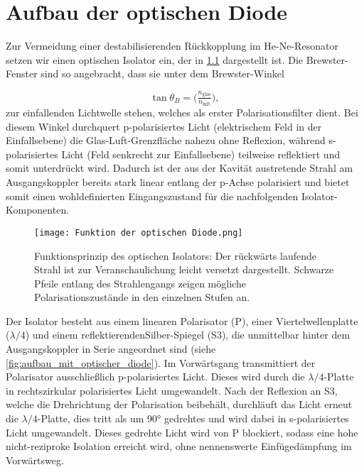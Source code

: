 \chapter{ Aufbau der optischen Diode}


Zur Vermeidung einer destabilisierenden Rückkopplung im He-Ne-Resonator setzen wir einen optischen Isolator ein, der in \cref{fig:function_of_optical_diode} dargestellt ist. 
Die Brewster-Fenster sind so angebracht, dass sie unter dem Brewster-Winkel \cite{introtoED}

\begin{equation}
  \tan\theta_B = \bigl(\tfrac{n_{\mathrm{glas}}}{n_{\mathrm{luft}}}\bigr),
\end{equation}
zur einfallenden Lichtwelle stehen, welches als erster Polarisationsfilter dient. 
Bei diesem Winkel durchquert p-polarisiertes Licht (elektrischem Feld in der Einfallsebene) die Glas-Luft-Grenzfläche nahezu ohne Reflexion, während s-polarisiertes Licht (Feld senkrecht zur Einfallsebene) teilweise reflektiert und somit unterdrückt wird. 
Dadurch ist der aus der Kavität austretende Strahl am Ausgangskoppler bereits stark linear entlang der p-Achse polarisiert und bietet somit einen wohldefinierten Eingangszustand für die nachfolgenden Isolator-Komponenten.

\begin{figure}[htbp]
  \centering
  \texttt{[image: Funktion der optischen Diode.png]}
  \caption{Funktionsprinzip des optischen Isolators: Der rückwärts laufende Strahl ist zur Veranschaulichung leicht versetzt dargestellt. Schwarze Pfeile entlang des Strahlengangs zeigen mögliche Polarisationszustände in den einzelnen Stufen an. \cite{praktikum}}
  \label{fig:function_of_optical_diode}
\end{figure}

Der Isolator besteht aus einem linearen Polarisator (P), einer Viertelwellenplatte ($\lambda/4$) und einem reflektierendenSilber-Spiegel (S3), die unmittelbar hinter dem Ausgangskoppler in Serie angeordnet sind (siehe \cref{fig:aufbau_mit_optischer_diode}). 
Im Vorwärtsgang transmittiert der Polarisator ausschließlich p-polarisiertes Licht.
Dieses wird durch die $\lambda/4$-Platte in rechtszirkular polarisiertes Licht umgewandelt.
Nach der Reflexion an S3, welche die Drehrichtung der Polarisation beibehält, durchläuft das Licht erneut die $\lambda/4$-Platte, dies tritt als um 90° gedrehtes und wird dabei in s-polarisiertes Licht umgewandelt.
Dieses gedrehte Licht wird von P blockiert, sodass eine hohe nicht-reziproke Isolation erreicht wird, ohne nennenswerte Einfügedämpfung im Vorwärtsweg.

